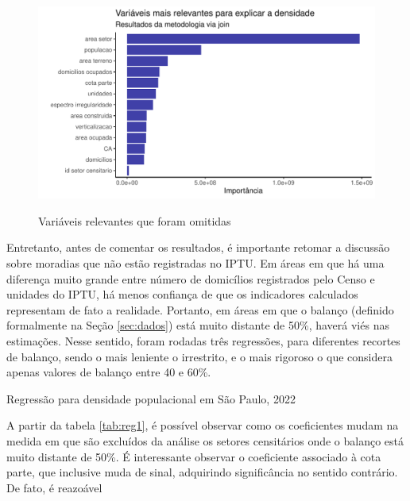 \begin{figure}[h]
    \centering
    \caption{Variáveis relevantes que foram omitidas}
    \includegraphics[width = .8\linewidth]{imagens/importancia.pdf}
    \label{fig:importancia}
\end{figure}

Entretanto, antes de comentar os resultados, é importante retomar a discussão sobre moradias que não estão registradas no IPTU. Em áreas em que há uma diferença muito grande entre número de domicílios registrados pelo Censo e unidades do IPTU, há menos confiança de que os indicadores calculados representam de fato a realidade. Portanto, em áreas em que o balanço (definido formalmente na Seção \ref{sec:dados}) está muito distante de 50\%, haverá viés nas estimações. Nesse sentido, foram rodadas três regressões, para diferentes recortes de balanço, sendo o mais leniente o irrestrito, e o mais rigoroso o que considera apenas valores de balanço entre 40 e 60\%.

\begin{table}[h]
    \caption{Regressão para densidade populacional em São Paulo, 2022}
    
    \label{tab:reg1}
\end{table}

A partir da tabela \ref{tab:reg1}, é possível observar como os coeficientes mudam na medida em que são excluídos da análise os setores censitários onde o balanço está muito distante de 50\%. É interessante observar o coeficiente associado à cota parte, que inclusive muda de sinal, adquirindo significância no sentido contrário. De fato, é reazoável







